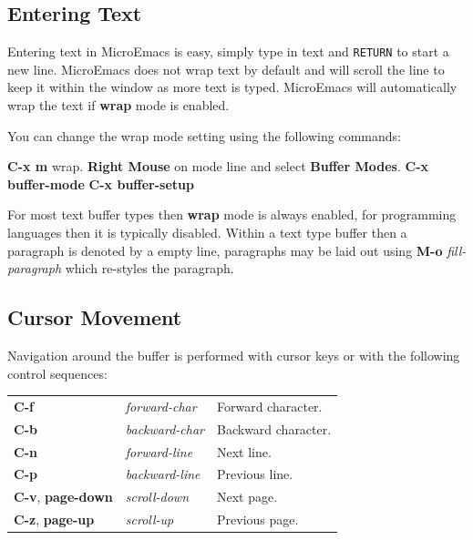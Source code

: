 \documentclass[11pt,a4paper,pdftex]{article}
\begin{document}
\subsection{Entering Text}

  Entering text in MicroEmacs is easy, simply type in text and \texttt{RETURN}
  to start a new line. MicroEmacs does not wrap text by default and will
  scroll the line to keep it within the window as more text is typed.
  MicroEmacs will automatically wrap the text if \textbf{wrap} mode is
  enabled.

  You can change the wrap mode setting using the following commands:

  \textbf{C-x m} wrap.\newline
  \textbf{Right Mouse} on mode line and select \textbf{Buffer Modes}.\newline
  \textbf{C-x buffer-mode}\newline
  \textbf{C-x buffer-setup}

  For most text buffer types then \textbf{wrap} mode is always enabled, for
  programming languages then it is typically disabled. Within a text type
  buffer then a paragraph is denoted by a empty line, paragraphs may be laid
  out using \textbf{M-o} \textit{fill-paragraph} which re-styles the
  paragraph.

\subsection{Cursor Movement}

  Navigation around the buffer is performed with cursor keys or with the
  following control sequences:

  \begin{longtable}{ll@{\ --\ }l}
    \endhead
    \endfoot
    \endlastfoot
    \textbf{C-f} & \textit{forward-char} &
    Forward character.\\
    \textbf{C-b} & \textit{backward-char} &
    Backward character.\\
    \textbf{C-n} & \textit{forward-line} &
    Next line.\\
    \textbf{C-p} & \textit{backward-line} &
    Previous line.\\
    \textbf{C-v}, \textbf{page-down} & \textit{scroll-down} &
    Next page.\\
    \textbf{C-z}, \textbf{page-up} & \textit{scroll-up} &
    Previous page.\\
  \end{longtable}
\end{document}
